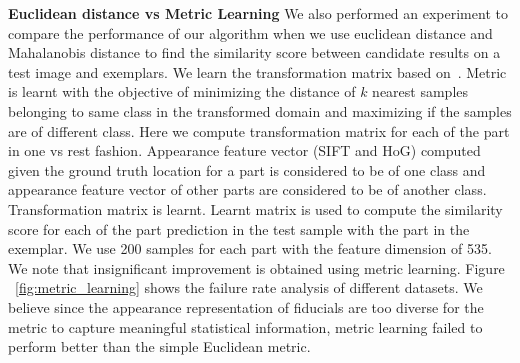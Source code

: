 \textbf{Euclidean distance vs Metric Learning}
\label{subsec:euc_vs_metric}
We also performed an experiment to compare the performance of our algorithm when we use euclidean distance and
Mahalanobis distance to find the similarity score between candidate results on a test image and exemplars. 
We learn the transformation matrix based on~\cite{weinberger09distance}. Metric is learnt with the objective of
minimizing the distance of $k$ nearest samples belonging to same class in the transformed domain and
maximizing if the samples are of different class. Here we compute transformation matrix for each of
the part in one vs rest fashion. Appearance feature vector (SIFT and HoG) computed given the ground
truth location for a part is considered to be of one class and appearance feature vector of other
parts are considered to be of another class. Transformation matrix is learnt. Learnt matrix is used
to compute the similarity score for each of the part prediction in the test sample with the part in
the exemplar. We use 200 samples for each part with the feature dimension of 535. 
We note that insignificant improvement is obtained using metric learning.
Figure ~\ref{fig:metric_learning} shows the failure rate analysis of different datasets. 
We believe since the appearance representation of fiducials are too diverse for the metric to capture
meaningful statistical information, metric learning failed to perform better than the simple Euclidean metric.


